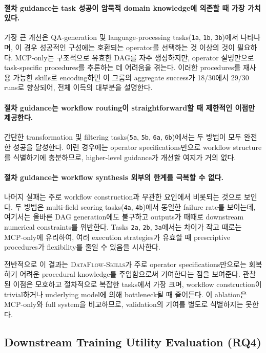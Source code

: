 \paragraph{절차 guidance는 task 성공이 암묵적 domain knowledge에 의존할 때 가장 가치 있다.}
가장 큰 개선은 QA-generation 및 language-processing tasks(\texttt{1a}, \texttt{1b}, \texttt{3b})에서 나타나며, 이 경우 성공적인 구성에는 호환되는 operator를 선택하는 것 이상의 것이 필요하다. MCP-only는 구조적으로 유효한 DAG를 자주 생성하지만, operator 설명만으로 task-specific procedures를 추론하는 데 어려움을 겪는다. 이러한 procedures를 재사용 가능한 skills로 encoding하면 이 그룹의 aggregate success가 18/30에서 29/30 runs로 향상되어, 전체 이득의 대부분을 설명한다.

\paragraph{절차 guidance는 workflow routing이 straightforward할 때 제한적인 이점만 제공한다.}
간단한 transformation 및 filtering tasks(\texttt{5a}, \texttt{5b}, \texttt{6a}, \texttt{6b})에서는 두 방법이 모두 완전한 성공을 달성한다. 이런 경우에는 operator specifications만으로 workflow structure를 식별하기에 충분하므로, higher-level guidance가 개선할 여지가 거의 없다.

\paragraph{절차 guidance는 workflow synthesis 외부의 한계를 극복할 수 없다.}
나머지 실패는 주로 workflow construction과 무관한 요인에서 비롯되는 것으로 보인다. 두 방법은 multi-field scoring tasks(\texttt{4a}, \texttt{4b})에서 동일한 failure rate를 보이는데, 여기서는 올바른 DAG generation에도 불구하고 outputs가 때때로 downstream numerical constraints를 위반한다. Tasks \texttt{2a}, \texttt{2b}, \texttt{3a}에서는 차이가 작고 때로는 MCP-only에 유리하여, 여러 execution strategies가 유효할 때 prescriptive procedures가 flexibility를 줄일 수 있음을 시사한다.

전반적으로 이 결과는 \textsc{DataFlow-Skills}가 주로 operator specifications만으로는 회복하기 어려운 procedural knowledge를 주입함으로써 기여한다는 점을 보여준다. 관찰된 이점은 모호하고 절차적으로 복잡한 tasks에서 가장 크며, workflow construction이 trivial하거나 underlying model에 의해 bottleneck될 때 줄어든다. 이 ablation은 MCP-only와 full system을 비교하므로, validation의 기여를 별도로 식별하지는 못한다.

\subsection{Downstream Training Utility Evaluation (\textbf{RQ4})}
\label{sec:rq4}

